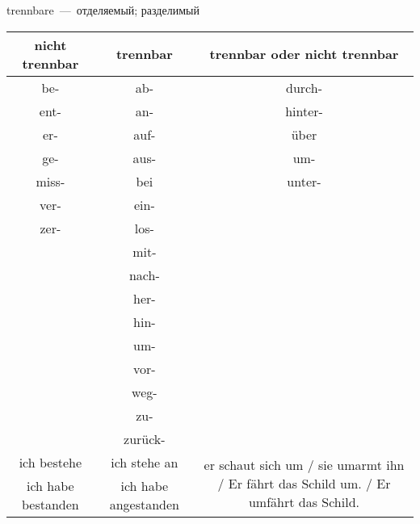 
trennbare~---~отделяемый; разделимый

\begin{tabular}{|c|c|c|}
\hline
nicht trennbar & trennbar & trennbar oder nicht trennbar \\
\hline
be- & ab- & durch- \\
ent- & an- & hinter- \\
er- & auf- & \"uber \\
ge- & aus- & um- \\
miss- & bei & unter- \\
ver- & ein- & ~ \\
zer- & los- & ~ \\
~ & mit- & ~ \\
~ & nach- & ~ \\
~ & her- & ~ \\
~ & hin- & ~ \\
~ & um- & ~ \\
~ & vor- & ~ \\
~ & weg- & ~ \\
~ & zu- & ~ \\
~ & zur\"uck- & ~ \\
\hline
ich bestehe & ich stehe an & \multirow{2}{7cm}{er schaut sich um / sie umarmt ihn / Er fährt das Schild um. / Er umfährt das Schild.} \\
ich habe bestanden & ich habe angestanden & \\
\hline
\end{tabular}

